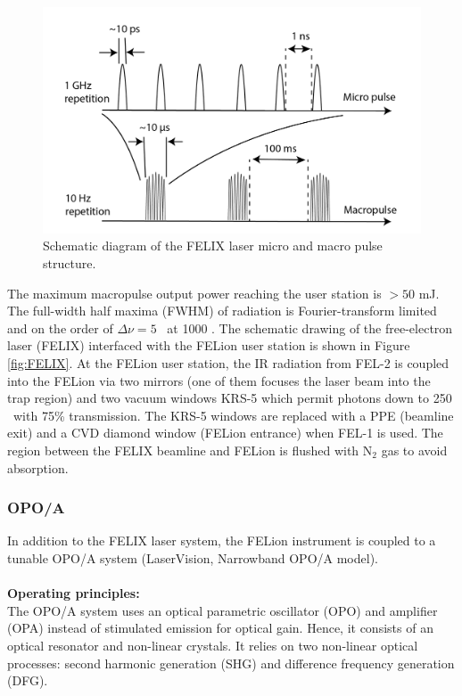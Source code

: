 \begin{figure}[!htb]
    \centering
    \includegraphics[scale=0.7]{figures/Instruments/FELIX-pulse-02.png}
    \caption{Schematic diagram of the FELIX laser micro and macro pulse structure.}
    \label{fig:FELIX-pulse}
\end{figure}

The maximum macropulse output power reaching the user station is $> 50$ mJ. The full-width half maxima (FWHM) of radiation is Fourier-transform limited and on the order of $\Delta \nu = 5$ \wn\ at 1000 \wn. The schematic drawing of the free-electron laser (FELIX) interfaced with the FELion user station is shown in Figure \ref{fig:FELIX}. At the FELion user station, the IR radiation from FEL-2 is coupled into the FELion via two mirrors (one of them focuses the laser beam into the trap region) and two vacuum windows KRS-5 which permit photons down to 250 \wn\ with 75\% transmission. The KRS-5 windows are replaced with a PPE (beamline exit) and a CVD diamond window (FELion entrance) when FEL-1 is used. The region between the FELIX beamline and FELion is flushed with N$_2$ gas to avoid absorption.

\subsubsection{OPO/A}
\label{subsec:ir:radiation-source:OPO}

In addition to the FELIX laser system, the FELion instrument is coupled to a tunable OPO/A system (LaserVision, Narrowband OPO/A model).\\
\\
\textbf{Operating principles:}\\

The OPO/A system uses an optical parametric oscillator (OPO) and amplifier (OPA) 
instead of stimulated emission for optical gain. Hence, it consists of an optical resonator and non-linear crystals. 
It relies on two non-linear optical processes: second harmonic generation (SHG) and difference frequency generation (DFG).

